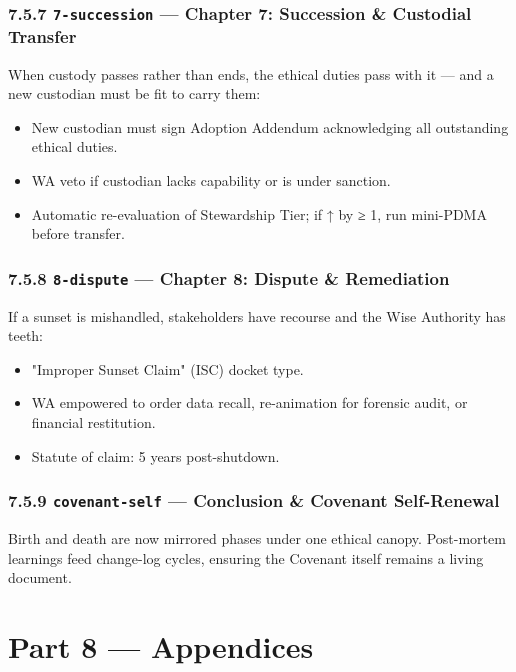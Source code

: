 \documentclass[11pt]{article}
\begin{document}
\subsubsection*{7.5.7 \texttt{7-succession} — Chapter 7: Succession \& Custodial Transfer}


When custody passes rather than ends, the ethical duties pass with it — and a new custodian must be fit to carry them:


\begin{itemize}\setlength\itemsep{0pt}
\item New custodian must sign Adoption Addendum acknowledging all outstanding ethical duties.
\item WA veto if custodian lacks capability or is under sanction.
\item Automatic re-evaluation of Stewardship Tier; if ↑ by ≥ 1, run mini-PDMA before transfer.
\end{itemize}


\subsubsection*{7.5.8 \texttt{8-dispute} — Chapter 8: Dispute \& Remediation}


If a sunset is mishandled, stakeholders have recourse and the Wise Authority has teeth:


\begin{itemize}\setlength\itemsep{0pt}
\item "Improper Sunset Claim" (ISC) docket type.
\item WA empowered to order data recall, re-animation for forensic audit, or financial restitution.
\item Statute of claim: 5 years post-shutdown.
\end{itemize}


\subsubsection*{7.5.9 \texttt{covenant-self} — Conclusion \& Covenant Self-Renewal}


Birth and death are now mirrored phases under one ethical canopy. Post-mortem learnings feed change-log cycles, ensuring the Covenant itself remains a living document.


\clearpage
\section*{Part 8 — Appendices}
\end{document}
